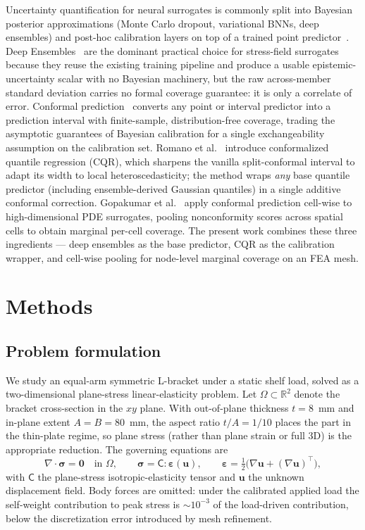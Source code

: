 \documentclass[11pt]{article}
\begin{document}
Uncertainty quantification for neural surrogates is commonly split into
Bayesian posterior approximations (Monte Carlo dropout, variational BNNs,
deep ensembles) and post-hoc calibration layers on top of a trained point
predictor~\cite{psaros2023uq}. Deep
Ensembles~\cite{lakshminarayanan2017ensembles} are the dominant practical
choice for stress-field surrogates because they reuse the existing
training pipeline and produce a usable epistemic-uncertainty scalar with
no Bayesian machinery, but the raw across-member standard deviation carries
no formal coverage guarantee: it is only a correlate of error. Conformal
prediction~\cite{angelopoulos2023conformal} converts any point or interval
predictor into a prediction interval with finite-sample, distribution-free
coverage, trading the asymptotic guarantees of Bayesian calibration for a
single exchangeability assumption on the calibration set. Romano et
al.~\cite{romano2019cqr} introduce conformalized quantile regression
(CQR), which sharpens the vanilla split-conformal interval to adapt its
width to local heteroscedasticity; the method wraps \emph{any} base
quantile predictor (including ensemble-derived Gaussian quantiles) in a
single additive conformal correction. Gopakumar et
al.~\cite{gopakumar2024conformal} apply conformal prediction cell-wise to
high-dimensional PDE surrogates, pooling nonconformity scores across
spatial cells to obtain marginal per-cell coverage. The present work
combines these three ingredients --- deep ensembles as the base predictor,
CQR as the calibration wrapper, and cell-wise pooling for node-level
marginal coverage on an FEA mesh.

\section{Methods}

\subsection{Problem formulation}

We study an equal-arm symmetric L-bracket under a static shelf load, solved
as a two-dimensional plane-stress linear-elasticity problem. Let
$\Omega \subset \mathbb{R}^2$ denote the bracket cross-section in the $xy$
plane. With out-of-plane thickness $t = 8$~mm and in-plane extent
$A = B = 80$~mm, the aspect ratio $t/A = 1/10$ places the part in the
thin-plate regime, so plane stress (rather than plane strain or full 3D) is
the appropriate reduction. The governing equations are
\begin{equation}
  \nabla \cdot \boldsymbol{\sigma} = \boldsymbol{0}
  \quad \text{in } \Omega,
  \qquad
  \boldsymbol{\sigma} = \mathsf{C}:\boldsymbol{\varepsilon}(\boldsymbol{u}),
  \qquad
  \boldsymbol{\varepsilon} = \tfrac{1}{2}
    \bigl( \nabla \boldsymbol{u} + (\nabla \boldsymbol{u})^\top \bigr),
\end{equation}
with $\mathsf{C}$ the plane-stress isotropic-elasticity tensor and
$\boldsymbol{u}$ the unknown displacement field. Body forces are omitted:
under the calibrated applied load the self-weight contribution to peak
stress is $\sim 10^{-3}$ of the load-driven contribution, below the
discretization error introduced by mesh refinement.
\end{document}
